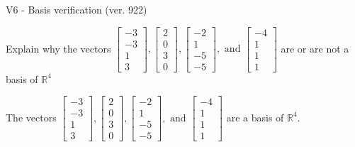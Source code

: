\begin{exercise}
  \begin{exerciseTitle}V6 - Basis verification (ver. 922)\end{exerciseTitle}
  \begin{exerciseStatement}
    Explain why the vectors \(\left[\begin{array}{r}
-3 \\
-3 \\
1 \\
3
\end{array}\right] , \left[\begin{array}{r}
2 \\
0 \\
3 \\
0
\end{array}\right] , \left[\begin{array}{r}
-2 \\
1 \\
-5 \\
-5
\end{array}\right] , \text{ and } \left[\begin{array}{r}
-4 \\
1 \\
1 \\
1
\end{array}\right]\) are or are not a basis of \(\mathbb{R}^4\)	


  \end{exerciseStatement}
  \begin{exerciseAnswer}
   The vectors \(\left[\begin{array}{r}
-3 \\
-3 \\
1 \\
3
\end{array}\right] , \left[\begin{array}{r}
2 \\
0 \\
3 \\
0
\end{array}\right] , \left[\begin{array}{r}
-2 \\
1 \\
-5 \\
-5
\end{array}\right] , \text{ and } \left[\begin{array}{r}
-4 \\
1 \\
1 \\
1
\end{array}\right]\) 
  	 are  a basis of \(\mathbb{R}^4\).
  


  \end{exerciseAnswer}
\end{exercise}